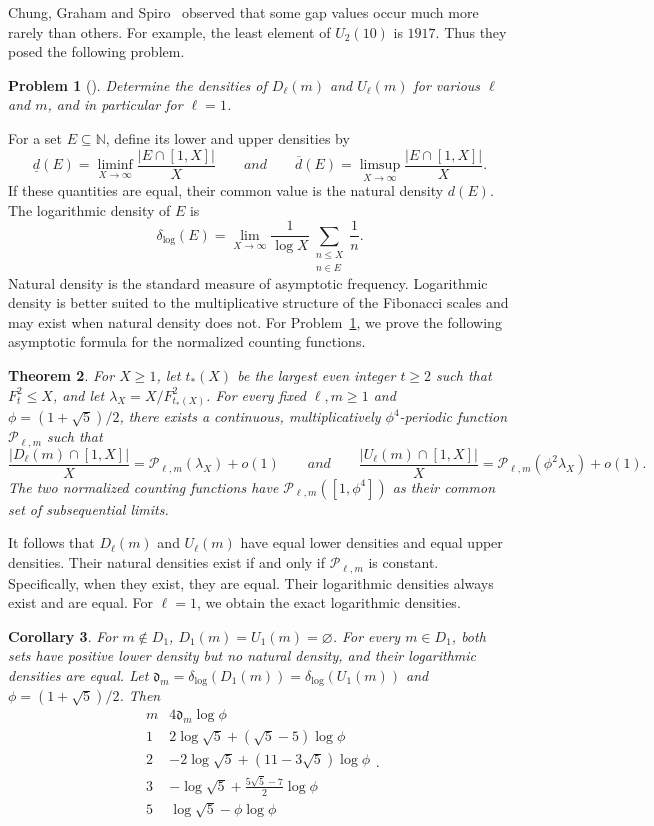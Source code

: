 \documentclass[11pt]{amsart}
\newtheorem{theorem}{Theorem}[section]
\newtheorem{corollary}[theorem]{Corollary}
\newtheorem{problem}[theorem]{Problem}
\theoremstyle{definition}
\begin{document}
Chung, Graham and Spiro~\cite{CGS} observed that some gap values occur much more rarely than others. For example, the least element of $U_2(10)$ is $1917$. Thus they posed the following problem.
\begin{problem}[\cite{CGS}]
\label{prob:refined-densities}
Determine the densities of $D_\ell(m)$ and $U_\ell(m)$ for various
$\ell$ and $m$, and in particular for $\ell=1$.
\end{problem}
For a set $E\subseteq\mathbb N$, define its lower and upper densities by
\[
\underline d(E)
=\liminf_{X\to\infty}\frac{|E\cap[1,X]|}{X}
\qquad{and}\qquad
\overline d(E)
=\limsup_{X\to\infty}\frac{|E\cap[1,X]|}{X}.
\]
If these quantities are equal, their common value is the natural density
$d(E)$. The logarithmic density of $E$ is
\[
\delta_{\log}(E)
=\lim_{X\to\infty}\frac1{\log X}
\sum_{\substack{n\leq X\\ n\in E}}\frac1n.
\]
Natural density is the standard measure of asymptotic frequency. Logarithmic density is better suited to the multiplicative structure of the Fibonacci scales and may exist when natural density does not. For Problem~\ref{prob:refined-densities}, we prove the following asymptotic formula for the normalized counting functions.
\begin{theorem}\label{thm:phase-density} For $X\geq1$, let $t_*(X)$ be the largest even integer $t\geq2$ such that $F_t^2\leq X$, and let $\lambda_X=X/F_{t_*(X)}^2$. For every fixed $\ell,m\geq1$ and $\phi=(1+\sqrt5)/2$, there exists a continuous, multiplicatively $\phi^4$-periodic function $\mathcal P_{\ell,m}$ such that 
\[
 \frac{|D_\ell(m)\cap[1,X]|}{X}
 =\mathcal P_{\ell,m}(\lambda_X)+o(1)\qquad{and}\qquad
 \frac{|U_\ell(m)\cap[1,X]|}{X}
 =\mathcal P_{\ell,m}(\phi^2\lambda_X)+o(1).
\]
The two normalized counting functions have $\mathcal P_{\ell,m}([1,\phi^4])$ as their common set of subsequential limits. 
\end{theorem}

It follows that $D_\ell(m)$ and $U_\ell(m)$ have equal lower densities and equal upper densities. Their natural densities exist if and only if $\mathcal P_{\ell,m}$ is constant. Specifically, when they exist, they are equal. Their logarithmic densities always exist and are equal. For $\ell=1$, we obtain the exact logarithmic densities.
\begin{corollary}
\label{cor:first-density}
For $m\notin D_1$, $D_1(m)=U_1(m)=\varnothing$. For every $m\in D_1$, both sets have positive lower density but no
natural density, and their logarithmic densities are equal. Let $\mathfrak d_m=\delta_{\log}(D_1(m))=\delta_{\log}(U_1(m))$ and $\phi=(1+\sqrt5)/2$. Then
\[
\begin{array}{c|c}
m&4\mathfrak d_m\log\phi\\ \hline
1&2\log\sqrt5+(\sqrt5-5)\log\phi\\
2&-2\log\sqrt5+(11-3\sqrt5)\log\phi\\
3&-\log\sqrt5+\frac{5\sqrt5-7}{2}\log\phi\\
5&\log\sqrt5-\phi\log\phi
\end{array}.
\]
\end{corollary}
\end{document}
